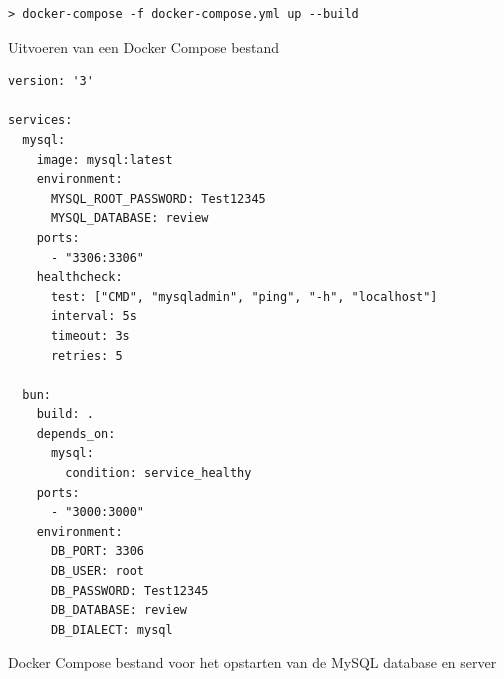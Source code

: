 \begin{listing}[H]
  \centering
  \begin{verbatim}
> docker-compose -f docker-compose.yml up --build
      \end{verbatim}
      \caption[Uitvoering Docker Compose]{\label{code:dockercompose}Uitvoeren van een Docker Compose bestand}
\end{listing}
\begin{listing}[H]
  \centering
  \begin{verbatim}
version: '3'

services:
  mysql:
    image: mysql:latest
    environment:
      MYSQL_ROOT_PASSWORD: Test12345
      MYSQL_DATABASE: review
    ports:
      - "3306:3306"
    healthcheck:
      test: ["CMD", "mysqladmin", "ping", "-h", "localhost"]
      interval: 5s
      timeout: 3s
      retries: 5

  bun:
    build: .
    depends_on:
      mysql:
        condition: service_healthy
    ports:
      - "3000:3000"
    environment:
      DB_PORT: 3306
      DB_USER: root
      DB_PASSWORD: Test12345
      DB_DATABASE: review
      DB_DIALECT: mysql
      \end{verbatim}
      \caption[Docker Compose bestand voor MySQL]{\label{code:dockercomposefile}Docker Compose bestand voor het opstarten van de MySQL database en server}
\end{listing}
